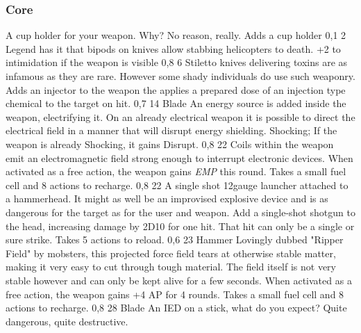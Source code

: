 \subsubsection{Core}
\vspace{8mm}
\begin{multicols}{2}
    {A cup holder for your weapon.
        Why? No reason, really.}
    {Adds a cup holder}
    {0,1}
    {2}
    {}
    {Legend has it that bipods on knives allow stabbing helicopters to death.}
    {+2 to intimidation if the weapon is visible}
    {0,8}
    {6}
    {}
    {Stiletto knives delivering toxins are as infamous as they are rare.
        However some shady individuals do use such weaponry.}
    {Adds an injector to the weapon the applies a prepared dose of
        an injection type chemical to the target on hit.}
    {0,7}
    {14}
    {Blade}
    {An energy source is added inside the weapon, electrifying it.
        On an already electrical weapon it is possible to direct the electrical field in a manner
        that will disrupt energy shielding.}
    {Shocking; If the weapon is already Shocking, it gains Disrupt.}
    {0,8}
    {22}
    {}
    {Coils within the weapon emit an electromagnetic field strong enough to interrupt electronic devices.}
    {When activated as a free action,
        the weapon gains \emph{EMP} this round.
        Takes a small fuel cell and 8 actions to recharge.}
    {0,8}
    {22}
    {}
    {A single shot 12gauge launcher attached to a hammerhead.
        It might as well be an improvised explosive device
        and is as dangerous for the target as for the user and weapon.}
    {Add a single-shot shotgun to the head,
        increasing damage by 2D10 for one hit.
        That hit can only be a single or sure strike.
        Takes 5 actions to reload.}
    {0,6}
    {23}
    {Hammer}
    {Lovingly dubbed "Ripper Field" by mobsters,
        this projected force field tears at otherwise stable matter,
        making it very easy to cut through tough material.
        The field itself is not very stable however
        and can only be kept alive for a few seconds.}
    {When activated as a free action,
        the weapon gains +4 AP for 4 rounds.
        Takes a small fuel cell and 8 actions to recharge.}
    {0,8}
    {28}
    {Blade}
    {An IED on a stick, what do you expect?
        Quite dangerous, quite destructive.}

\end{multicols}
